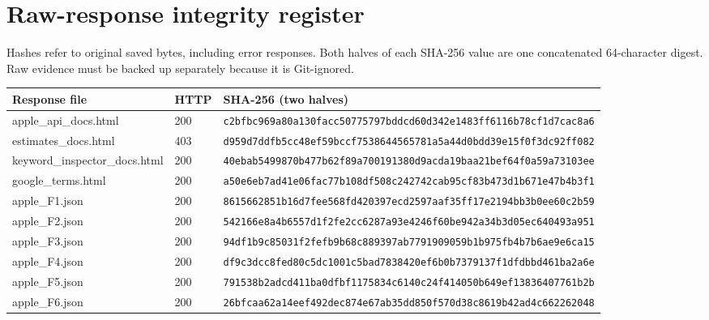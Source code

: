 \documentclass[10pt,a4paper]{article}
\begin{document}
\clearpage\section{Raw-response integrity register}
Hashes refer to original saved bytes, including error responses. Both halves
of each SHA-256 value are one concatenated 64-character digest. Raw evidence
must be backed up separately because it is Git-ignored.
\small
\begin{longtable}{L{54mm}L{12mm}L{82mm}}
\toprule Response file & HTTP & SHA-256 (two halves)\\\midrule\endhead
apple\_api\_docs.html & 200 & \texttt{c2bfbc969a80a130facc50775797bddc}\newline\texttt{d60d342e1483ff6116b78cf1d7cac8a6} \\
estimates\_docs.html & 403 & \texttt{d959d7ddfb5cc48ef59bccf753864456}\newline\texttt{5781a5a44d0bdd39e15f0f3dc92ff082} \\
keyword\_inspector\_docs.html & 200 & \texttt{40ebab5499870b477b62f89a70019138}\newline\texttt{0d9acda19baa21bef64f0a59a73103ee} \\
google\_terms.html & 200 & \texttt{a50e6eb7ad41e06fac77b108df508c24}\newline\texttt{2742cab95cf83b473d1b671e47b4b3f1} \\
apple\_F1.json & 200 & \texttt{8615662851b16d7fee568fd420397ecd}\newline\texttt{2597aaf35ff17e2194bb3b0ee60c2b59} \\
apple\_F2.json & 200 & \texttt{542166e8a4b6557d1f2fe2cc6287a93e}\newline\texttt{4246f60be942a34b3d05ec640493a951} \\
apple\_F3.json & 200 & \texttt{94df1b9c85031f2fefb9b68c889397ab}\newline\texttt{7791909059b1b975fb4b7b6ae9e6ca15} \\
apple\_F4.json & 200 & \texttt{df9c3dcc8fed80c5dc1001c5bad78384}\newline\texttt{20ef6b0b7379137f1dfdbbd461ba2a6e} \\
apple\_F5.json & 200 & \texttt{791538b2adcd411ba0dfbf1175834c61}\newline\texttt{40c24f414050b649ef13836407761b2b} \\
apple\_F6.json & 200 & \texttt{26bfcaa62a14eef492dec874e67ab35d}\newline\texttt{d850f570d38c8619b42ad4c662262048} \\

\end{longtable}
\end{document}
